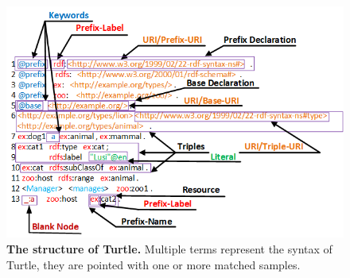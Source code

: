 \begin{figure}[ht]
	\begin{center}
		\includegraphics[scale=0.8,angle=0]{images/TurtleStructure.png}
		\setlength\belowcaptionskip{-5mm}
		\caption{\textbf{The structure of Turtle.} Multiple terms represent the syntax of Turtle, they are pointed with one or more matched samples.}
		\label{Fig:TurtleStructure}
	\end{center}
\end{figure}
